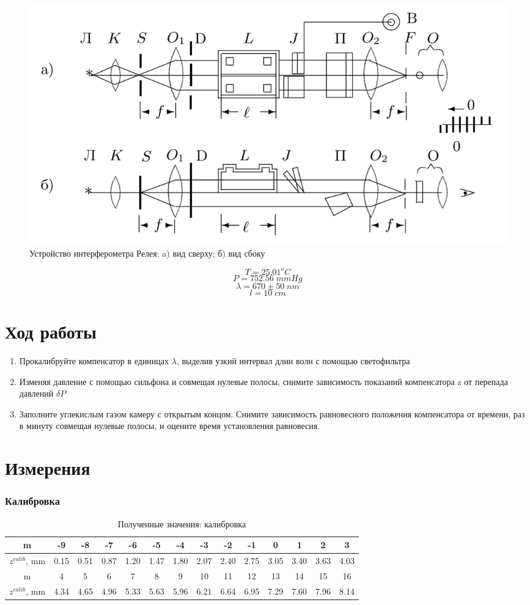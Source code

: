 \documentclass[a4paper, 12pt]{article}
\begin{document}
\begin{figure}[H]
	\centering
	\includegraphics[width = 17 cm]{1.png}
	\caption{Устройство интерферометра Релея: a) вид сверху; б) вид сбоку}
\end{figure}
\[T = 25.01 ^oC\]
\[P = 752.56 \; mmHg\]
\[\lambda = 670\pm50\; nm\]
\[l = 10\; cm\]


\section{Ход работы}
\begin{enumerate}
	\item Прокалибруйте компенсатор в единицах $\lambda$, выделив узкий интервал длин волн с помощью светофильтра
	\item Изменяя давление с помощью сильфона и совмещая нулевые полосы, снимите зависимость показаний компенсатора z от перепада давлений $\delta P$
	\item Заполните углекислым газом камеру с открытым концом. Снимите зависимость равновесного положения компенсатора от времени, раз в минуту совмещая нулевые полосы, и оцените время установления равновесия.

\end{enumerate}
\newpage

\section{Измерения}
\subsubsection*{Калибровка}
\begin{table}[H]
	\centering
	\begin{tabular}{|c|c|c|c|c|c|c|c|c|c|c|c|c|c|}
		\hline	
		
m&-9&-8&-7&-6&-5&-4&-3&-2&-1&0&1&2&3\\ \hline
$z^{calib}$, mm&0.15&0.51&0.87&1.20&1.47&1.80&2.07&2.40&2.75&3.05&3.40&3.63&4.03\\ \hline
m&4&5&6&7&8&9&10&11&12&13&14&15&16\\ \hline
$z^{calib}$, mm&4.34&4.65&4.96&5.33&5.63&5.96&6.21&6.64&6.95&7.29&7.60&7.96&8.14\\ \hline


	\end{tabular}	
	\caption{Полученные значения: калибровка}
\end{table}
\end{document}
